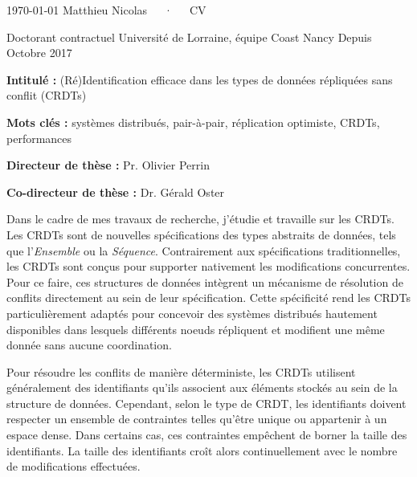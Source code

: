 \documentclass[12pt, a4paper]{awesome-cv}
\begin{document}
\makecvheader[C]

\makecvfooter
  {\today}
  {Matthieu Nicolas~~~·~~~CV}
  {\thepage}


\begin{cventries}

\cventry
  {Doctorant contractuel}
  {Université de Lorraine, équipe Coast}
  {Nancy}
  {Depuis Octobre 2017}
  {
    \begin{cvitems} %
      \item {\textbf{Intitulé :} (Ré)Identification efficace dans les types de données répliquées sans conflit (CRDTs)}
      \item{\textbf{Mots clés :} systèmes distribués, pair-à-pair, réplication optimiste, CRDTs, performances}
      \item{\textbf{Directeur de thèse :} Pr. Olivier Perrin}
      \item{\textbf{Co-directeur de thèse :} Dr. Gérald Oster}
    \end{cvitems}
  }

\begin{cvparagraph}
  Dans le cadre de mes travaux de recherche, j'étudie et travaille sur les \acfp{CRDT}.
  Les \acp{CRDT} sont de nouvelles spécifications des types abstraits de données, tels que l'\emph{Ensemble} ou la \emph{Séquence}.
  Contrairement aux spécifications traditionnelles, les \acp{CRDT} sont conçus pour supporter nativement les modifications concurrentes.
  Pour ce faire, ces structures de données intègrent un mécanisme de résolution de conflits directement au sein de leur spécification.
  Cette spécificité rend les \acp{CRDT} particulièrement adaptés pour concevoir des systèmes distribués hautement disponibles dans lesquels différents noeuds répliquent et modifient une même donnée sans aucune coordination.

  Pour résoudre les conflits de manière déterministe, les \acp{CRDT} utilisent généralement des identifiants qu'ils associent aux éléments stockés au sein de la structure de données.
  Cependant, selon le type de \ac{CRDT}, les identifiants doivent respecter un ensemble de contraintes telles qu'être unique ou appartenir à un espace dense.
  Dans certains cas, ces contraintes empêchent de borner la taille des identifiants.
  La taille des identifiants croît alors continuellement avec le nombre de modifications effectuées.


\end{cvparagraph}
\end{cventries}
\end{document}
